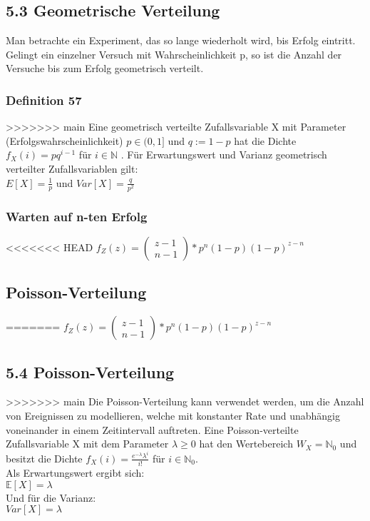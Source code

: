 \documentclass[11pt]{article}
\begin{document}
\begin{enumerate}
\begin{enumerate}
{\begin{enumerate}
\begin{enumerate}
\begin{enumerate}
\subsection{5.3 Geometrische Verteilung}
\label{sec:orgeacbd9b}
Man betrachte ein Experiment, das so lange wiederholt wird, bis Erfolg eintritt. Gelingt ein einzelner Versuch mit Wahrscheinlichkeit p, so ist die Anzahl der Versuche bis zum Erfolg geometrisch verteilt.
\subsubsection{Definition 57}
\label{sec:org05d92f4}
>>>>>>> main
Eine geometrisch verteilte Zufallsvariable X mit Parameter (Erfolgswahrscheinlichkeit)
\(p \in (0, 1]\) und \(q := 1 - p\) hat die Dichte
\(f_X(i) = pq^{i-1}\) für \(i \in \mathbb{N}\) .
Für Erwartungswert und Varianz geometrisch verteilter Zufallsvariablen gilt: \\
\(E[X] = \frac{1}{p}\) und \(Var[X] = \frac{q}{p^2}\)
\subsubsection{Warten auf n-ten Erfolg}
<<<<<<< HEAD
\label{sec:orgfebd376}
\(f_Z(z) = \begin{pmatrix} z - 1 \\ n - 1 \end{pmatrix} * p^n(1-p) (1-p)^{z-n}\)
\subsection{Poisson-Verteilung}
\label{sec:orgd58ea2c}
=======
\label{sec:org9c3e16d}
\(f_Z(z) = \begin{pmatrix} z - 1 \\ n - 1 \end{pmatrix} * p^n(1-p) (1-p)^{z-n}\)
\subsection{5.4 Poisson-Verteilung}
\label{sec:org6600172}
>>>>>>> main
Die Poisson-Verteilung kann verwendet werden, um die Anzahl von Ereignissen zu
modellieren, welche mit konstanter Rate und unabhängig voneinander in einem
Zeitintervall auftreten.
Eine Poisson-verteilte Zufallsvariable X mit dem Parameter \(\lambda \geq 0\) hat den
Wertebereich \(W_X = \mathbb{N}_0\) und besitzt die Dichte
\(f_X(i) = \frac{e^{-\lambda}\lambda^i}{i!}\) für \(i \in \mathbb{N}_0\). \\
Als Erwartungswert ergibt sich: \\
\(\mathbb{E}[X] = \lambda\) \\
Und für die Varianz: \\
\(Var[X] = \lambda\)

\end{enumerate}
\end{enumerate}
\end{enumerate}}
\end{enumerate}
\end{enumerate}
\end{document}
